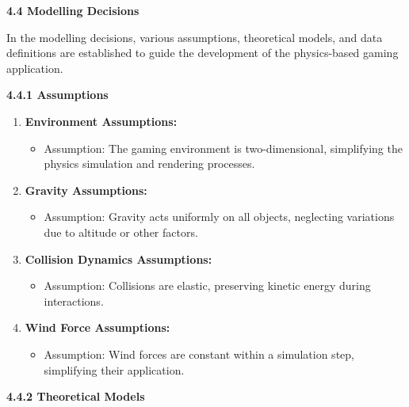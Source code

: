 \documentclass[
]{article}
\begin{document}
\textbf{4.4 Modelling Decisions}

In the modelling decisions, various assumptions, theoretical models, and
data definitions are established to guide the development of the
physics-based gaming application.

\textbf{4.4.1 Assumptions}

\begin{enumerate}
\def\labelenumi{\arabic{enumi}.}
\item
  \textbf{Environment Assumptions:}

  \begin{itemize}
  \item
    Assumption: The gaming environment is two-dimensional, simplifying
    the physics simulation and rendering processes.
  \end{itemize}
\item
  \textbf{Gravity Assumptions:}

  \begin{itemize}
  \item
    Assumption: Gravity acts uniformly on all objects, neglecting
    variations due to altitude or other factors.
  \end{itemize}
\item
  \textbf{Collision Dynamics Assumptions:}

  \begin{itemize}
  \item
    Assumption: Collisions are elastic, preserving kinetic energy during
    interactions.
  \end{itemize}
\item
  \textbf{Wind Force Assumptions:}

  \begin{itemize}
  \item
    Assumption: Wind forces are constant within a simulation step,
    simplifying their application.
  \end{itemize}
\end{enumerate}

\textbf{4.4.2 Theoretical Models}
\end{document}
